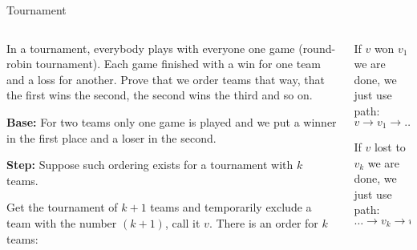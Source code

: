 \documentclass[9pt,aspectratio=169]{beamer}
\begin{document}
\begin{frame}{Tournament}
  \begin{columns}[T]
    \begin{column}{0.5\textwidth}
      \begin{problem}
        In a tournament, everybody plays with everyone one game (round-robin tournament). Each game finished with a win for one team and a loss for another. Prove that we order teams that way, that the first wins the second, the second wins the third and so on.
      \end{problem}\pause

      \textbf{Base:} For two teams only one game is played and we put a winner in the first place and a loser in the second.\pause

      \textbf{Step:} Suppose such ordering exists for a tournament with $k$ teams. 

      Get the tournament of $k+1$ teams and temporarily exclude a team with the number $(k+1)$, call it $v$. There is an order for $k$ teams:
      \begin{center}
      \end{center}\pause
    \end{column}
    \begin{column}{0.5\textwidth}
      If $v$ won $v_{1}$ we are done, we just use path:
      \[ v \to v_1 \to \dots . \]\pause

      If $v$ lost to $v_{k}$ we are done, we just use path:
      \[ \dots \to v_k \to v . \]\pause


\end{column}
\end{columns}
\end{frame}
\end{document}
